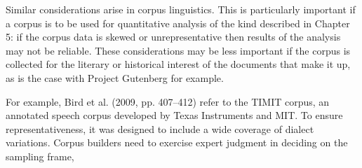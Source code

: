 Similar considerations arise in corpus linguistics. This is particularly important if a
corpus is to be used for quantitative analysis of the kind described in Chapter 5: if
the corpus data is skewed or unrepresentative then results of the analysis may not be
reliable. These considerations may be less important if the corpus is collected for the
literary or historical interest of the documents that make it up, as is the case with
Project Gutenberg for example.

For example, Bird et al. (2009, pp. 407–412) refer to the TIMIT corpus, an annotated
speech corpus developed by Texas Instruments and MIT. To ensure
representativeness, it was designed to include a wide coverage of dialect variations.
Corpus builders need to exercise expert judgment in deciding on the sampling frame,
